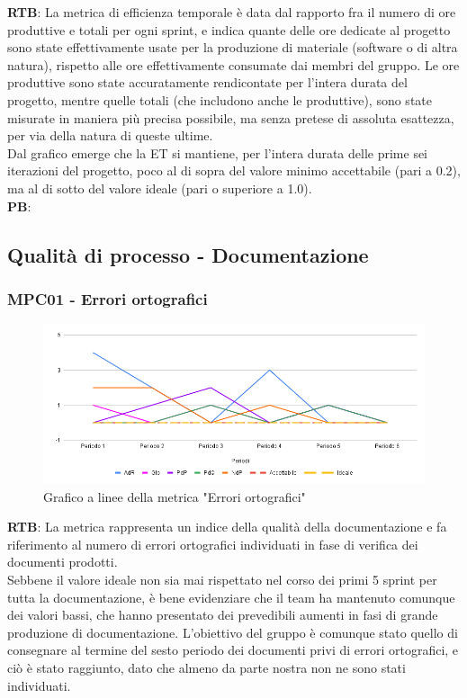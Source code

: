\documentclass[10pt]{article}
\begin{document}
\begin{justify}
\textbf{RTB}: La metrica di efficienza temporale è data dal rapporto fra il numero di ore produttive e totali per ogni sprint, e indica quante delle ore dedicate al progetto
sono state effettivamente usate per la produzione di materiale (software o di altra natura), rispetto alle ore effettivamente consumate dai membri del gruppo. Le ore produttive sono state accuratamente rendicontate per l'intera durata del progetto, mentre quelle totali (che includono anche le produttive), sono state misurate in
maniera più precisa possibile, ma senza pretese di assoluta esattezza, per via della natura di queste ultime.\\
Dal grafico emerge che la ET si mantiene, per l'intera durata delle prime sei iterazioni del progetto, poco al di sopra del valore minimo accettabile (pari a 0.2), ma al di 
sotto del valore ideale (pari o superiore a 1.0).\\

\noindent
\textbf{PB}:


\subsection{Qualità di processo - Documentazione}
\subsubsection{MPC01 - Errori ortografici}%

\begin{figure}[H]
  \centering
  \includegraphics[width=0.9\linewidth]{EO.png}
  \caption{Grafico a linee della metrica "Errori ortografici"}
  \label{fig:EOchart}
\end{figure}

\textbf{RTB}: La metrica rappresenta un indice della qualità della documentazione e fa riferimento al numero di errori ortografici individuati in fase di verifica 
dei documenti prodotti.\\
Sebbene il valore ideale non sia mai rispettato nel corso dei primi 5 sprint per tutta la documentazione, è bene evidenziare che il team ha mantenuto comunque dei valori bassi, che hanno 
presentato dei prevedibili aumenti in fasi di grande produzione di documentazione. L'obiettivo del gruppo è comunque stato quello di consegnare al termine del sesto periodo
dei documenti privi di errori ortografici, e ciò è stato raggiunto, dato che almeno da parte nostra non ne sono stati individuati.\\


\end{justify}
\end{document}
